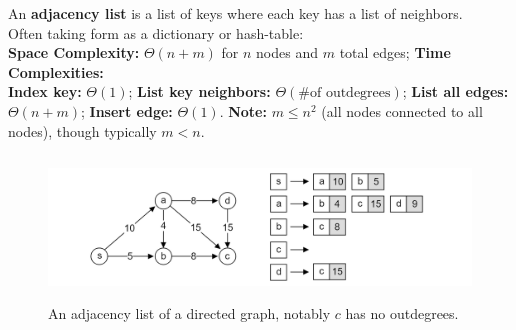 \newpage
\begin{Def}

  \label{def:adj_list}
    An \textbf{adjacency list} is a list of keys where each key has a list of neighbors.\\

    \noindent
    Often taking form as a dictionary or hash-table:\\
    \textbf{Space Complexity:} $\Theta (n+m)$ for $n$ nodes and $m$ total edges; \textbf{Time Complexities:}\\
    \textbf{Index key:} $\Theta (1)$; \textbf{List key neighbors:} $\Theta(\text{\# of outdegrees})$; \textbf{List all edges:} $\Theta(n+m)$;
    \textbf{Insert edge:} $\Theta(1)$. \textbf{Note:} $m\leq n^2$ (all nodes connected to all nodes), though typically $m < n$.
\end{Def}

\begin{figure}[h]
  \begin{center}
    \includegraphics[height=1.5in]{./Sections/graphs/adj_list.png}
  \end{center}
   \caption{An adjacency list of a directed graph, notably $c$ has no outdegrees.}\label{fig:adj_list}
\end{figure}






